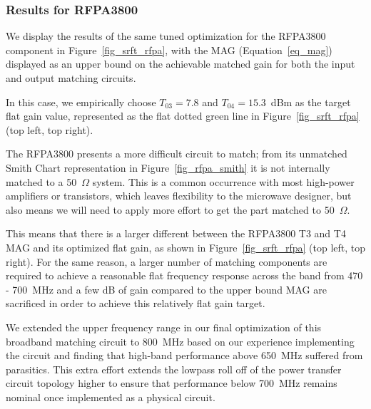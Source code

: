 \pagebreak


%
%

\subsubsection{Results for RFPA3800}

	We display the results of the same tuned optimization for the RFPA3800 component in Figure~\ref{fig_srft_rfpa}, with the \ac{MAG} (Equation~\ref{eq_mag}) displayed as an upper bound on the achievable matched gain for both the input and output matching circuits.
	
	In this case, we empirically choose $T_{03} = 7.8$ and $T_{04} = 15.3$~dBm as the target flat gain value, represented as the flat dotted green line in Figure~\ref{fig_srft_rfpa} (top left, top right).
		
	The RFPA3800 presents a more difficult circuit to match; from its unmatched Smith Chart representation in Figure~\ref{fig_rfpa_smith} it is not internally matched to a 50~$\Omega$ system.
	This is a common occurrence with most high-power amplifiers or transistors, which leaves flexibility to the microwave designer, but also means we will need to apply more effort to get the part matched to 50~$\Omega$.

	This means that there is a larger different between the RFPA3800 T3 and T4 \ac{MAG} and its optimized flat gain, as shown in Figure~\ref{fig_srft_rfpa} (top left, top right).
	For the same reason, a larger number of matching components are required to achieve a reasonable flat frequency response across the band from 470 - 700~MHz and a few dB of gain compared to the upper bound \ac{MAG} are sacrificed in order to achieve this relatively flat gain target.
	
	We extended the upper frequency range in our final optimization of this broadband matching circuit to 800~MHz based on our experience implementing the circuit and finding that high-band performance above 650~MHz suffered from parasitics.
	This extra effort extends the lowpass roll off of the power transfer circuit topology higher to ensure that performance below 700~MHz remains nominal once implemented as a physical circuit.

